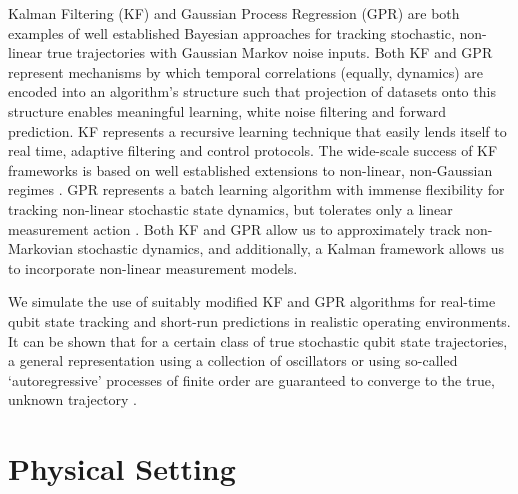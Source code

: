  Kalman Filtering (KF) and Gaussian Process Regression (GPR) are both examples of well established Bayesian approaches for tracking stochastic, non-linear true trajectories with Gaussian Markov noise inputs. Both KF and GPR represent mechanisms by which temporal correlations (equally, dynamics) are encoded into an algorithm's structure such that projection of datasets onto this structure enables meaningful learning, white noise filtering and forward prediction.  KF represents a recursive learning technique that easily lends itself to real time, adaptive filtering and control protocols. The wide-scale success of KF frameworks is based on well established extensions to non-linear, non-Gaussian regimes \cite{grewal2001theory}. GPR represents a batch learning algorithm with immense flexibility for tracking non-linear stochastic state dynamics, but tolerates only a linear measurement action \cite{rasmussen2005gaussian}. Both  KF and GPR allow us to approximately track non-Markovian stochastic dynamics, and additionally, a Kalman framework allows us to incorporate non-linear measurement models.

We simulate the use of suitably modified KF and GPR algorithms for real-time qubit state tracking and short-run predictions in realistic operating environments. It can be shown that for a certain class of true stochastic qubit state trajectories, a general representation using a collection of oscillators or using so-called `autoregressive' processes of finite order are guaranteed to converge to the true, unknown trajectory \cite{karlin2012first}.

\fi



\section{Physical Setting \label{sec:main:PhysicalSetting}}  
\label{sec:main:1} 


